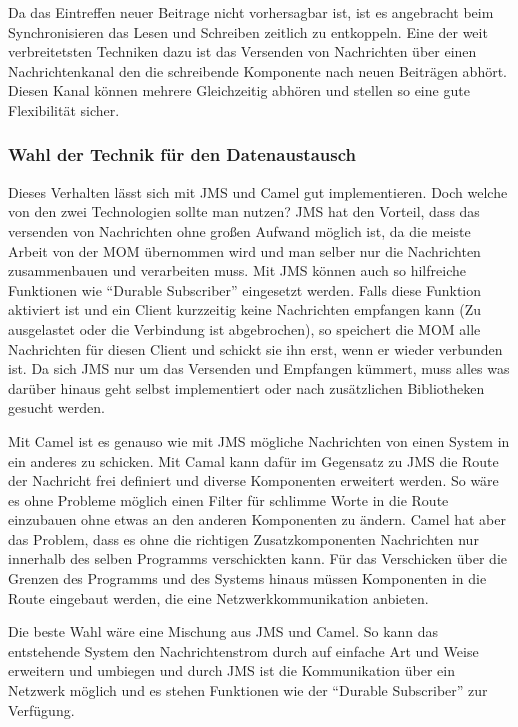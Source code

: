 Da das Eintreffen neuer Beitrage nicht vorhersagbar ist, ist es angebracht beim Synchronisieren das Lesen und Schreiben zeitlich zu entkoppeln. Eine der weit verbreitetsten Techniken dazu ist das Versenden von Nachrichten über einen Nachrichtenkanal den die schreibende Komponente nach neuen Beiträgen abhört. Diesen Kanal können mehrere Gleichzeitig abhören und stellen so eine gute Flexibilität sicher. 

\subsubsection{Wahl der Technik für den Datenaustausch} %
\label{ssub:wahl_der_technik_für_den_datenaustausch}

Dieses Verhalten lässt sich mit JMS und Camel gut implementieren. Doch welche von den zwei Technologien sollte man nutzen? JMS hat den Vorteil, dass das versenden von Nachrichten ohne großen Aufwand möglich ist, da die meiste Arbeit von der MOM übernommen wird und man selber nur die Nachrichten zusammenbauen und verarbeiten muss. Mit JMS können auch so hilfreiche Funktionen wie \enquote{Durable Subscriber} eingesetzt werden. Falls diese Funktion aktiviert ist und ein Client kurzzeitig keine Nachrichten empfangen kann (Zu ausgelastet oder die Verbindung ist abgebrochen), so speichert die MOM alle Nachrichten für diesen Client und schickt sie ihn erst, wenn er wieder verbunden ist. Da sich JMS nur um das Versenden und Empfangen kümmert, muss alles was darüber hinaus geht selbst implementiert oder nach zusätzlichen Bibliotheken gesucht werden.

Mit Camel ist es genauso wie mit JMS mögliche Nachrichten von einen System in ein anderes zu schicken. Mit Camal kann dafür im Gegensatz zu JMS die Route der Nachricht frei definiert und diverse Komponenten erweitert werden. So wäre es ohne Probleme möglich einen Filter für schlimme Worte in die Route einzubauen ohne etwas an den anderen Komponenten zu ändern. Camel hat aber das Problem, dass es ohne die richtigen Zusatzkomponenten Nachrichten nur innerhalb des selben Programms verschickten kann. Für das Verschicken über die Grenzen des Programms und des Systems hinaus müssen Komponenten in die Route eingebaut werden, die eine Netzwerkkommunikation anbieten. 

Die beste Wahl wäre eine Mischung aus JMS und Camel. So kann das entstehende System den Nachrichtenstrom durch auf einfache Art und Weise erweitern und umbiegen und durch JMS ist die Kommunikation über ein Netzwerk möglich und es stehen Funktionen wie der \enquote{Durable Subscriber} zur Verfügung.

